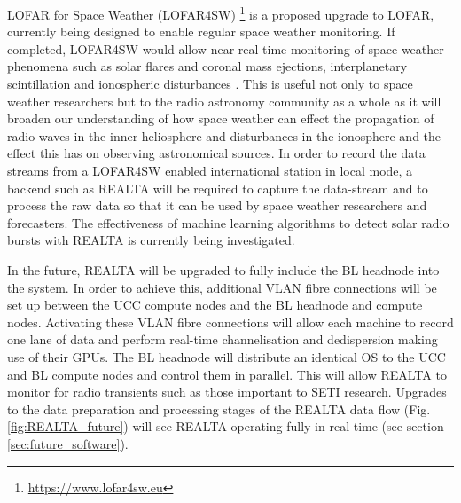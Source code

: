 LOFAR for Space Weather (LOFAR4SW) \footnote{\hyperref[LOFAR4SW]{https://www.lofar4sw.eu}} is a proposed upgrade to LOFAR, currently being designed to enable regular space weather monitoring. If completed, LOFAR4SW would allow near-real-time monitoring of space weather phenomena such as solar flares and coronal mass ejections, interplanetary scintillation and ionospheric disturbances \citep{Carley2020}. This is useful not only to space weather researchers but to the radio astronomy community as a whole as it will broaden our understanding of how space weather can effect the propagation of radio waves in the inner heliosphere and disturbances in the ionosphere and the effect this has on observing astronomical sources. In order to record the data streams from a LOFAR4SW enabled international station in local mode, a backend such as REALTA will be required to capture the data-stream and to process the raw data so that it can be used by space weather researchers and forecasters. The effectiveness of machine learning algorithms to detect solar radio bursts with REALTA is currently being investigated.

In the future, REALTA will be upgraded to fully include the BL headnode into the system. In order to achieve this, additional VLAN fibre connections will be set up between the UCC compute nodes and the BL headnode and compute nodes. Activating these VLAN fibre connections will allow each machine to record one lane of data and perform real-time channelisation and dedispersion making use of their GPUs.  The BL headnode will distribute an identical OS to the UCC and BL compute nodes and control them in parallel. This will allow REALTA to monitor for radio transients such as those important to SETI research. Upgrades to the data preparation and processing stages of the REALTA data flow (Fig. \ref{fig:REALTA_future}) will see REALTA operating fully in real-time (see section \ref{sec:future_software}). %


